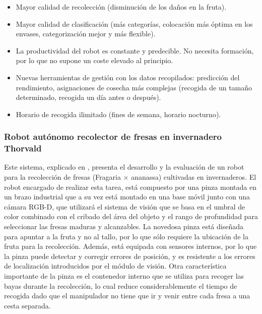 \begin{itemize}
    \item Mayor calidad de recolección (disminución de los daños en la fruta).
    \item Mayor calidad de clasificación (más categorías, colocación más óptima 								en los envases, categorización mejor y más flexible).
    \item La productividad del robot es constante y predecible. No necesita formación, por lo que no supone un coste elevado al principio.
    \item Nuevas herramientas de gestión con los datos recopilados: predicción del rendimiento, asignaciones de cosecha más complejas (recogida de un tamaño
determinado, recogida un día antes o después).
    \item Horario de recogida ilimitado (fines de semana, horario nocturno).
\end{itemize}

\newpage
\subsubsection{Robot autónomo recolector de fresas en invernadero Thorvald}
Este sistema, explicado en \cite{Xiong19}, presenta el desarrollo y la evaluación de un robot para la recolección de fresas (Fragaria × ananassa) cultivadas en invernaderos. El robot encargado de realizar esta tarea, está compuesto por una pinza montada en un brazo industrial que a su vez está montado en una base móvil junto con una cámara RGB-D, que utilizará el sistema de visión que se basa en el umbral de color combinado con el cribado del área del objeto y el rango de profundidad para seleccionar las fresas maduras y alcanzables. La novedosa pinza está diseñada para apuntar a la fruta y no al tallo, por lo que sólo requiere la ubicación de la fruta para la recolección. Además, está equipada con sensores internos, por lo que la pinza puede detectar y corregir errores de posición, y es resistente a los errores de localización introducidos por el módulo de visión. Otra característica importante de la pinza es el contenedor interno que se utiliza para recoger las bayas durante la recolección, lo cual reduce considerablemente el tiempo de recogida dado que el manipulador no tiene que ir y venir entre cada fresa a una cesta separada.

